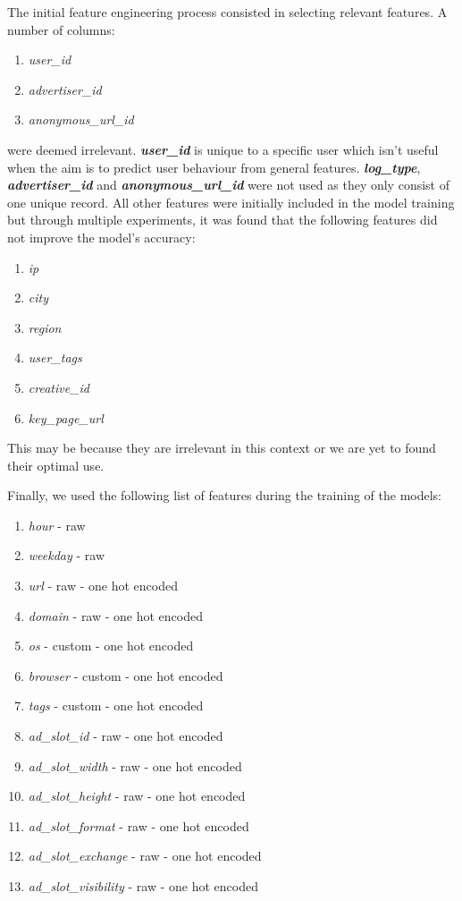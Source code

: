 \documentclass{article} %
\begin{document}
The initial feature engineering process consisted in selecting relevant features. A number of columns: 

\begin{enumerate}
    \item \textit{user\_id}
    \item \textit{advertiser\_id}
    \item \textit{anonymous\_url\_id}
\end{enumerate}

were deemed irrelevant. \textbf{\textit{user\_id}} is unique to a specific user which isn't useful when the aim is to predict user behaviour from general features. \textbf{\textit{log\_type}}, \textbf{\textit{advertiser\_id}} and \textbf{\textit{anonymous\_url\_id}} were not used as they only consist of one unique record. All other features were initially included in the model training but through multiple experiments, it was found that the following features did not improve the model's accuracy: 

\begin{enumerate}
    \item \textit{ip}
    \item \textit{city}
    \item \textit{region}
    \item \textit{user\_tags}
    \item \textit{creative\_id}
    \item \textit{key\_page\_url}
\end{enumerate}

This may be because they are irrelevant in this context or we are yet to found their optimal use.

Finally, we used the following list of features during the training of the models:

\begin{enumerate}
    \item \textit{hour} - raw
    \item \textit{weekday} - raw

    \item \textit{url} - raw - one hot encoded
    \item \textit{domain} - raw - one hot encoded
    \item \textit{os} - custom - one hot encoded
    \item \textit{browser} - custom - one hot encoded
    \item \textit{tags} - custom - one hot encoded
    \item \textit{ad\_slot\_id} - raw - one hot encoded
    \item \textit{ad\_slot\_width} - raw - one hot encoded
    \item \textit{ad\_slot\_height} - raw - one hot encoded
    \item \textit{ad\_slot\_format} - raw - one hot encoded
    \item \textit{ad\_slot\_exchange} - raw - one hot encoded
    \item \textit{ad\_slot\_visibility} - raw - one hot encoded
\end{enumerate}
\end{document}
